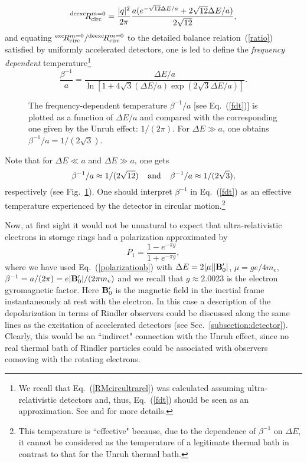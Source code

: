 \documentclass[12pt,nofootinbib,floatfix,aps,prd,showpacs,amsmath,amssymb,eqsecnum]{revtex4-2}
\begin{document}
$$
^{\rm deexc}\! R^{m=0}_{{\rm circ}} = 
\frac{|q|^2}{2 \pi} 
\frac{a (e^{-\sqrt{12} \Delta E/a} + 2 \sqrt{12} \Delta E/a  )}{2\sqrt{12}},
$$
and equating 
$^{\rm exc}\! R^{m=0}_{\rm circ}/ ^{\rm deexc}\! R^{m=0}_{\rm circ}$ 
to the detailed balance relation~(\ref{ratio})
satisfied by uniformly accelerated detectors, one is led 
to define the  {\em frequency dependent}  
temperature\footnote{We recall that Eq.~(\ref{RMcircultrarel})
was calculated assuming ultra-relativistic detectors and, thus,
Eq.~(\ref{fdt}) should be seen as an approximation. See 
\textcite{Letawetal82} and \textcite{Obadiaetal07} for more details. }
\begin{equation}
\frac{\beta^{-1}}{a} = 
\frac{\Delta E/a}{\ln [1+ 4 \sqrt{3} (\Delta E/a) \exp (2\sqrt{3} \Delta E/a)]}.
\label{fdt}
\end{equation}
\begin{figure}
\begin{center}
\mbox{}
\end{center}
\caption{The frequency-dependent temperature $\beta^{-1}/a $ 
[see Eq.~(\ref{fdt})] is plotted as a function of $\Delta E/a$ 
and compared with the corresponding one given by the Unruh 
effect: $ 1/(2\pi)$. For $\Delta E \gg a$, one obtains 
$ \beta^{-1}/a = 1/(2 \sqrt{3})$.
}
\label{effect-temp}
\end{figure}
Note that for $\Delta E \ll a $ and $\Delta E \gg a $, one gets
$$ 
\beta^{-1}/a \approx  {1}/(2 \sqrt{12})
\;\;\;\; {\rm and} \;\;\;\;
\beta^{-1}/a \approx  {1}/(2 \sqrt{3}),
$$
respectively (see Fig.~\ref{effect-temp}). One should interpret 
$\beta^{-1}$ in Eq.~(\ref{fdt}) as an effective temperature
experienced by the detector in circular motion.\footnote{This temperature
is ``effective" because, due to the dependence of 
$\beta^{-1}$ on $\Delta E$, it cannot
be considered as the temperature of a legitimate thermal bath in 
contrast to that for the Unruh thermal bath.}

Now, at first sight it would not be unnatural to expect that 
ultra-relativistic electrons in storage rings had a polarization 
approximated by
\begin{equation}
P_1 = 
\frac{1 - e^{-\pi g}}{1 + e^{- \pi g}},
\label{polarization2}
\end{equation}
where we have used Eq.~(\ref{polarizationb}) with
$
\Delta E = 2 | \mu | | {\bf B}'_0 |
$, $\mu = ge/4m_e$,
$
\beta^{-1} = a/(2\pi) = e |{\bf B}'_0|/(2 \pi m_e)
$
and we recall that $g \approx 2.0023 $ is the electron gyromagnetic
factor.
Here ${\bf B}'_0$ is the magnetic field in the inertial frame 
instantaneously at rest with the electron.
In this case a description of the depolarization in terms of Rindler 
observers could be discussed along the same lines as the excitation
of accelerated detectors (see Sec.~\ref{subsection:detector}).
Clearly, this would be an ``indirect" connection with the Unruh effect,
since no real thermal bath of Rindler particles could be associated 
with observers comoving with the rotating electrons. 
\end{document}
